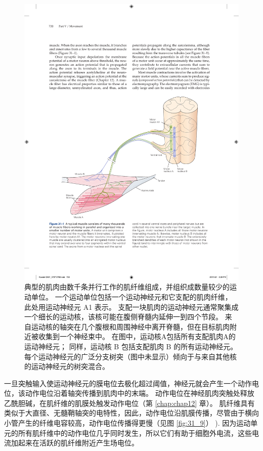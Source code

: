 \begin{figure}[htbp]
	\centering
	\includegraphics[width=0.9\linewidth]{chap31/fig_31_1}
	\caption{典型的肌肉由数千条并行工作的肌纤维组成，并组织成数量较少的运动单位。 
		一个运动单位包括一个运动神经元和它支配的肌肉纤维，此处用运动神经元 A1 表示。 支配一块肌肉的运动神经元通常聚集成一个细长的运动核，该核可能在腹侧脊髓内延伸一到四个节段。 来自运动核的轴突在几个腹根和周围神经中离开脊髓，但在目标肌肉附近被收集到一个神经束中。 在图中，运动核A包括所有支配肌肉A的运动神经元； 同样，运动核 B 包括支配肌肉 B 的所有运动神经元。每个运动神经元的广泛分支树突（图中未显示）倾向于与来自其他核的运动神经元的树突混合。}
	\label{fig:31_1}
\end{figure}


一旦突触输入使运动神经元的膜电位去极化超过阈值，神经元就会产生一个动作电位，该动作电位沿着轴突传播到肌肉中的末端。 动作电位在神经肌肉突触处释放乙酰胆碱，在肌纤维的肌膜处触发动作电位（第 \ref{chap:chap12} 章）。 肌纤维具有类似于大直径、无髓鞘轴突的电特性，因此，动作电位沿肌膜传播，尽管由于横向小管产生的纤维电容较高，动作电位传播得更慢（见图 \ref{fig:31_9}） ). 因为运动单元的所有肌纤维中的动作电位几乎同时发生，所以它们有助于细胞外电流，这些电流加起来在活跃的肌纤维附近产生场电位。

